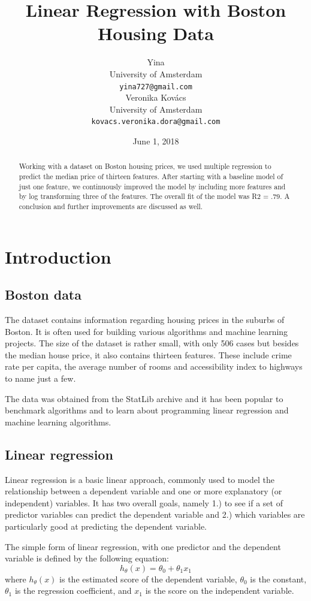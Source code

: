 \documentclass[11pt]{article}
\title{Linear Regression with Boston Housing Data}
\author{ Yina\\
  University of Amsterdam \\
  {\tt yina727@gmail.com} \\\And
  Veronika Kovács \\
  University of Amsterdam \\
  {\tt kovacs.veronika.dora@gmail.com} \\}
\date{June 1, 2018}
\begin{document}
\maketitle

\begin{abstract}
 Working with a dataset on Boston housing prices, we used multiple regression to predict the median price of thirteen features. After starting with a baseline model of just one feature, we continuously improved the model by including more features and by log transforming three of the features. The overall fit of the model was R2 = .79. A conclusion and further improvements are discussed as well. 
\end{abstract}

\section{Introduction}
\subsection{Boston data}
  The dataset contains information regarding housing prices in the suburbs of Boston. It is often used for building various algorithms and machine learning projects. The size of the dataset is rather small, with only 506 cases but besides the median house price, it also contains thirteen features. These include crime rate per capita, the average number of rooms and accessibility index to highways to name just a few. 

The data was obtained from the StatLib archive and it has been popular to benchmark algorithms and to learn about programming linear regression and machine learning algorithms.

\subsection{Linear regression}
Linear regression is a basic linear approach, commonly used to model the relationship between a dependent variable and one or more explanatory (or independent) variables. It has two overall goals, namely 1.) to see if a set of predictor variables can predict the dependent variable and 2.) which variables are particularly good at predicting the dependent variable.

The simple form of linear regression, with one predictor and the dependent variable is defined by the following equation:   
  \[h_{\theta}(x) = \theta_{0} + \theta_{1}x_{1}\]
  where $h_{\theta}(x)$ is the estimated score of the dependent variable, $\theta_{0}$ is the constant,  $\theta_{1}$ is the regression coefficient, and $x_{1}$ is the score on the independent variable.
\end{document}
